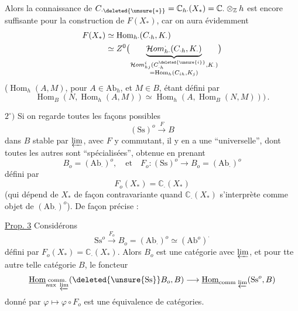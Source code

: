 Alors la connaissance de $C_{\cdot\deleted{\unsure{*}}}=\mathbb C_{h\cdot}(X_*)
=\mathbb C_\cdot\otimes_{\mathbb Z}h$ est encore suffisante pour
la construction de $F(X_*)$, car on aura
évidemment
\[
\begin{aligned}
F(X_*)&\simeq\operatorname{Hom}_{h\cdot}(C_{\cdot h},K_\cdot)\\
&\simeq Z^0\bigl(\underbrace{\mathcal Hom^{\cdot}_{h\cdot}(C_{\cdot h},K_\cdot)}_{
\substack{\mathcal Hom^i_{hj}(C_{\cdot h}^{\deleted{\unsure{i}}},K_\cdot)\\
=\operatorname{Hom}_h(C_{ih},K_j)}}\bigr)
\end{aligned}
\]
($\operatorname{Hom}_h(A,M)$, pour $A\in\mathrm{Ab}_h$, et $M\in B$, étant
défini par
\[
\operatorname{Hom}_B(N,\operatorname{Hom}_h(A,M))\simeq
\operatorname{Hom}_h(A,\operatorname{Hom}_B(N,M)))\,.
\]

$2^\circ)$ Si on regarde toutes les façons possibles
\[
(\mathrm{Ss})^o\xrightarrow{F}B
\]
dans $B$ stable par $\varprojlim$, avec $F$ y
commutant, il y en a  une
``universelle'', dont toutes les autres sont
``spécialisées'', obtenue en prenant
\[
B_o=(\mathrm{Ab}_\cdot)^o,\quad\text{et}\quad
F_o:(\mathrm{Ss})^o\longrightarrow B_o=(\mathrm{Ab}_\cdot)^o
\]
défini par
\[
F_o(X_*)=\mathbb C_\cdot(X_*)
\]
(qui dépend de $X_*$ de façon contravariante
quand $\mathbb C_\cdot(X_*)$ s'interprète comme
objet de $(\mathrm{Ab}_\cdot)^o$). De façon précise :

\uline{Prop. 3} Considérons
\[
\mathrm{Ss}^o\xrightarrow{F_o}B_o=(\mathrm{Ab}_\cdot)^o\simeq(\mathrm{Ab}^o)^\cdot
\]
défini par $F_o(X_*)=\mathbb C_\cdot(X_*)$. Alors
$B_o$ est une catégorie  avec $\varprojlim$, et
pour tte autre telle catégorie $B$,
le foncteur
\[
\underline{\operatorname{Hom}}_{\substack{\mathrm{comm.}\\\text{aux }\varprojlim}}
(\deleted{\unsure{\mathrm{Ss}}}B_o,B)\longrightarrow
\underline{\operatorname{Hom}}_{\mathrm{comm}\,\varprojlim}(\mathrm{Ss}^o,B)
\]
donné par $\varphi\longmapsto\varphi\circ F_o$
est une équivalence de catégories.

